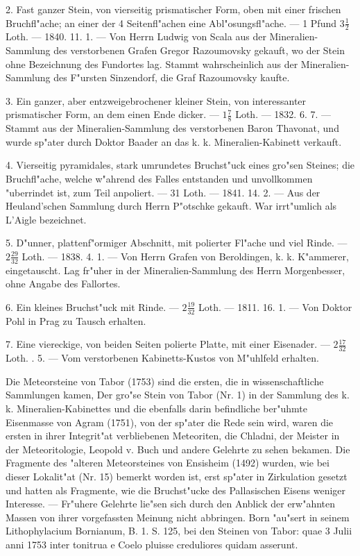 \documentclass[a4paper, 11pt, oneside, polutonikogreek, german]{article}
\begin{document}
2. Fast ganzer Stein, von vierseitig prismatischer Form, oben mit einer frischen Bruchfl"ache; an einer der 4 Seitenfl"achen eine Abl"osungsfl"ache. --- 1 Pfund $3\frac{1}{2}$ Loth. --- 1840. 11. 1. --- Von Herrn Ludwig von Scala aus der Mineralien-Sammlung des verstorbenen Grafen Gregor Razoumovsky gekauft, wo der Stein ohne Bezeichnung des Fundortes lag. Stammt wahrscheinlich aus der Mineralien-Sammlung des F"ursten Sinzendorf, die Graf Razoumovsky kaufte.

3. Ein ganzer, aber entzweigebrochener kleiner Stein, von interessanter prismatischer Form, an dem einen Ende dicker. --- $1\frac{7}{8}$ Loth. --- 1832. 6. 7. --- Stammt aus der Mineralien-Sammlung des verstorbenen Baron Thavonat, und wurde sp"ater durch Doktor Baader an das k. k. Mineralien-Kabinett verkauft.

4. Vierseitig pyramidales, stark umrundetes Bruchst"uck eines gro"sen Steines; die Bruchfl"ache, welche w"ahrend des Falles entstanden und unvollkommen "uberrindet ist, zum Teil anpoliert. --- 31 Loth. --- 1841. 14. 2. --- Aus der Heuland'schen Sammlung durch Herrn P"otschke gekauft. War irrt"umlich als L'Aigle bezeichnet.

5. D"unner, plattenf"ormiger Abschnitt, mit polierter Fl"ache und viel Rinde. --- $2\frac{29}{32}$ Loth. --- 1838. 4. 1. --- Von Herrn Grafen von Beroldingen, k. k. K"ammerer, eingetauscht. Lag fr"uher in der Mineralien-Sammlung des Herrn Morgenbesser, ohne Angabe des Fallortes.

6. Ein kleines Bruchst"uck mit Rinde. --- $2\frac{19}{32}$ Loth. --- 1811. 16. 1. --- Von Doktor Pohl in Prag zu Tausch erhalten.

7. Eine viereckige, von beiden Seiten polierte Platte, mit einer Eisenader. --- $2\frac{17}{32}$ Loth. . 5. --- Vom verstorbenen Kabinetts-Kustos von M"uhlfeld erhalten.

Die Meteorsteine von Tabor (1753) sind die ersten, die in wissenschaftliche Sammlungen kamen, Der gro"se Stein von Tabor (Nr. 1) in der Sammlung des k. k. Mineralien-Kabinettes und die ebenfalls darin befindliche ber"uhmte Eisenmasse von Agram (1751), von der sp"ater die Rede sein wird, waren die ersten in ihrer Integrit"at verbliebenen Meteoriten, die Chladni, der Meister in der Meteoritologie, Leopold v. Buch und andere Gelehrte zu sehen bekamen. Die Fragmente des "alteren Meteorsteines von Ensisheim (1492) wurden, wie bei dieser Lokalit"at (Nr. 15) bemerkt worden ist, erst sp"ater in Zirkulation gesetzt und hatten als Fragmente, wie die Bruchst"ucke des Pallasischen Eisens weniger Interesse. --- Fr"uhere Gelehrte lie"sen sich durch den Anblick der erw"ahnten Massen von ihrer vorgefassten Meinung nicht abbringen. Born "au"sert in seinem Lithophylacium Bornianum, B. 1. S. 125, bei den Steinen von Tabor: quae 3 Julii anni 1753 inter tonitrua e Coelo pluisse creduliores quidam asserunt.
\end{document}
